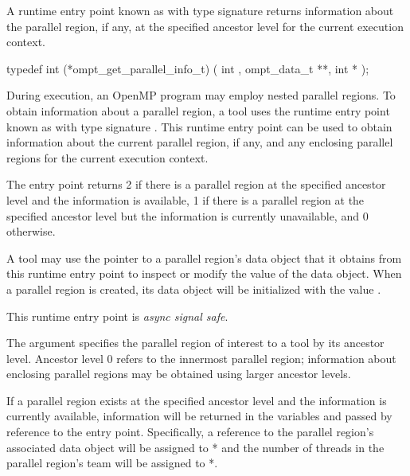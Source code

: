 A runtime entry point known as 
with type signature 
returns information about
the parallel region, if any, at the specified ancestor level
for the current execution context.

\format
\begin{ccppspecific}
\begin{omptInquiry}
typedef int (*ompt_get_parallel_info_t) (
  int ,
  ompt_data_t **,
  int *
);
\end{omptInquiry}
\end{ccppspecific}

\descr
During execution, an OpenMP program may employ nested parallel
regions.
To obtain information about a parallel region,
a tool uses the runtime entry point known as
with type signature .
This runtime entry point
can be used to obtain information about the current parallel region,
if any, and any enclosing parallel regions
for the current execution context.

The entry point returns 2 if there is a parallel region at the
specified ancestor level and the information is available,
1 if there is a parallel region at the specified ancestor level
but the information is currently unavailable, and 0 otherwise.

A tool may use the pointer to a parallel region's data object that it
obtains from this runtime entry point to inspect or modify the value
of the data object.  When a parallel region is created, its data
object will be initialized with the value .

This runtime entry point is \emph{async signal safe}.

\argdesc

The argument  specifies the parallel region
of interest to a tool by its ancestor level.  Ancestor level 0 refers
to the innermost parallel region; information about enclosing parallel
regions may be obtained using larger ancestor levels.

If a parallel region exists at the specified ancestor level
and the information is currently available,
information will be returned in the variables  and
 passed by reference to the entry point.
Specifically, a reference to the parallel region's associated data
object will be assigned to * and the number of
threads in the parallel region's team will be assigned to
*.

